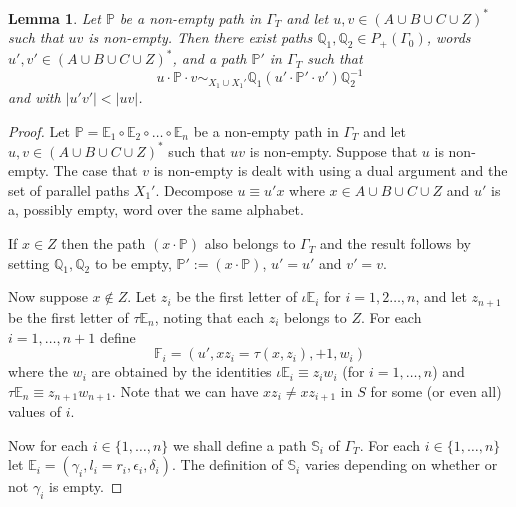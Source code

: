 \documentclass[11pt]{amsart}
\newtheorem{lem}{Lemma}
\theoremstyle{plain}
\begin{document}
\begin{lem}\label{Last}
Let ${\mathbb{P}}$ be a non-empty path in $\Gamma_T$ and let $u,v \in (A \cup B \cup C \cup Z)^*$ such that $uv$ is non-empty. Then there exist paths ${\mathbb{Q}}_1, {\mathbb{Q}}_2 \in P_+(\Gamma_0)$, words $u', v' \in (A \cup B \cup C \cup Z)^*$, and a path ${\mathbb{P}}'$ in $\Gamma_T$ such that
\[
u \cdot {\mathbb{P}} \cdot v \sim_{X_1 \cup X_1'} {\mathbb{Q}}_1 (u' \cdot {\mathbb{P}}' \cdot v') {\mathbb{Q}}_2^{-1}
\]
and with $|u'v'| < |uv|$.
\end{lem}
\begin{proof}
Let ${\mathbb{P}} = {\mathbb{E}}_1 \circ {\mathbb{E}}_2 \circ \ldots \circ {\mathbb{E}}_n$ be a non-empty path in $\Gamma_T$ and let $u,v \in (A \cup B \cup C \cup Z)^*$ such that $uv$ is non-empty. Suppose that $u$ is non-empty. The case that $v$ is non-empty is dealt with using a dual argument and the set of parallel paths $X_1'$. Decompose $u \equiv u'x$ where $x \in A \cup B \cup C \cup Z$ and $u'$ is a, possibly empty, word over the same alphabet.

If $x \in Z$ then the path $(x \cdot {\mathbb{P}})$ also belongs to $\Gamma_T$ and the result follows by setting ${\mathbb{Q}}_1, {\mathbb{Q}}_2$ to be empty, ${\mathbb{P}}' := (x \cdot {\mathbb{P}})$, $u' = u'$ and $v' = v$.

Now suppose $x \not\in Z$. Let $z_i$ be the first letter of $\iota {\mathbb{E}}_i$ for $i=1,2 \ldots, n$, and let $z_{n+1}$ be the first letter of $\tau {\mathbb{E}}_n$, noting that each $z_i$ belongs to $Z$. For each $i = 1, \ldots, n+1$ define
\[
{\mathbb{F}}_i = (u', x z_i = \tau(x,z_i), +1, w_i)
\]
where the $w_i$ are obtained by the identities $\iota {\mathbb{E}}_i \equiv z_i w_i$ (for $i= 1, \ldots, n$) and $\tau {\mathbb{E}}_n \equiv z_{n+1} w_{n+1}$. Note that we can have $xz_i \neq xz_{i+1}$ in $S$ for some (or even all) values of $i$.

Now  for each $i \in \{1, \ldots, n\}$ we shall define a path ${\mathbb{S}}_i$ of $\Gamma_T$. For each $i \in \{1, \ldots, n\}$ let ${\mathbb{E}}_i = (\gamma_i, l_i = r_i, \epsilon_i, \delta_i)$. The definition of ${\mathbb{S}}_i$ varies depending on whether or not $\gamma_i$ is empty.


\end{proof}
\end{document}
